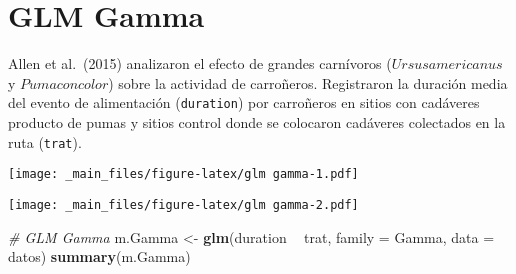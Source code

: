 \documentclass[
]{book}
\newenvironment{Shaded}{\begin{snugshade}}{\end{snugshade}}
\newcommand{\CommentTok}[1]{\textcolor[rgb]{0.56,0.35,0.01}{\textit{#1}}}
\newcommand{\DataTypeTok}[1]{\textcolor[rgb]{0.13,0.29,0.53}{#1}}
\newcommand{\DecValTok}[1]{\textcolor[rgb]{0.00,0.00,0.81}{#1}}
\newcommand{\KeywordTok}[1]{\textcolor[rgb]{0.13,0.29,0.53}{\textbf{#1}}}
\newcommand{\NormalTok}[1]{#1}
\newcommand{\OperatorTok}[1]{\textcolor[rgb]{0.81,0.36,0.00}{\textbf{#1}}}
\newcommand{\OtherTok}[1]{\textcolor[rgb]{0.56,0.35,0.01}{#1}}
\newcommand{\StringTok}[1]{\textcolor[rgb]{0.31,0.60,0.02}{#1}}
\begin{document}
\hypertarget{glm-gamma}{%
\section{GLM Gamma}\label{glm-gamma}}

Allen et al.~(2015) analizaron el efecto de grandes carnívoros (\(Ursus americanus\) y \(Puma concolor\)) sobre la actividad de carroñeros. Registraron la duración media del evento de alimentación (\texttt{duration}) por carroñeros en sitios con cadáveres producto de pumas y sitios control donde se colocaron cadáveres colectados en la ruta (\texttt{trat}).

\begin{Shaded}
\end{Shaded}

\texttt{[image: \_main\_files/figure-latex/glm gamma-1.pdf]}

\begin{Shaded}
\end{Shaded}

\texttt{[image: \_main\_files/figure-latex/glm gamma-2.pdf]}

\begin{Shaded}
\begin{Highlighting}[]
\CommentTok{# GLM Gamma }
\NormalTok{m.Gamma <-}\StringTok{ }\KeywordTok{glm}\NormalTok{(duration }\OperatorTok{~}\StringTok{ }\NormalTok{trat, }\DataTypeTok{family =}\NormalTok{ Gamma, }\DataTypeTok{data =}\NormalTok{ datos) }
\KeywordTok{summary}\NormalTok{(m.Gamma)}
\end{Highlighting}
\end{Shaded}
\end{document}
